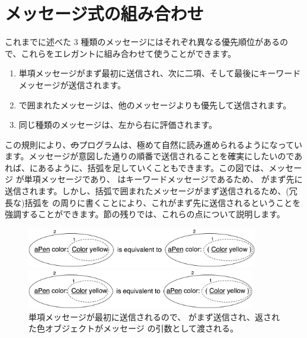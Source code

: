 \documentclass[a4paper,10pt,twoside]{book}
\begin{document}

\section{メッセージ式の組み合わせ}
これまでに述べた 3 種類のメッセージにはそれぞれ異なる優先順位があるので、これらをエレガントに組み合わせて使うことができます。

\begin{enumerate}
\item 単項メッセージがまず最初に送信され、次に二項、そして最後にキーワードメッセージが送信されます。
\item {}で囲まれたメッセージは、他のメッセージよりも優先して送信されます。
\item 同じ種類のメッセージは、左から右に評価されます。
\end{enumerate}

この規則により、\st のプログラムは、極めて自然に読み進められるようになっています。メッセージが意図した通りの順番で送信されることを確実にしたいのであれば、にあるように、括弧を足していくこともできます。この図では、メッセージ  が単項メッセージであり、 はキーワードメッセージであるため、 がまず先に送信されます。しかし、括弧で囲まれたメッセージがまず送信されるため、(冗長な)括弧を  の周りに書くことにより、これがまず先に送信されるということを強調することができます。節の残りでは、これらの点について説明します。

\begin{figure}[ht]
\ifluluelse
	{\centerline{\includegraphics[width=0.9\textwidth]{uKeyUn}} }
	{\centerline{\includegraphics[width=10cm]{uKeyUn}} }
\caption{単項メッセージが最初に送信されるので、 がまず送信され、返された色オブジェクトがメッセージ  の引数として渡される。}
\end{figure}
\end{document}
